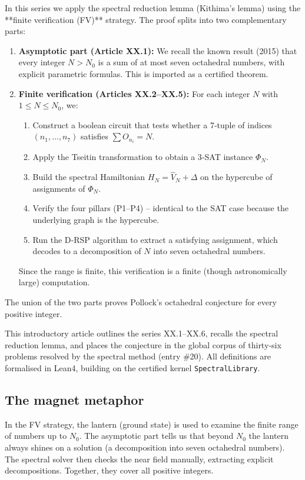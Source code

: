 \documentclass[11pt,a4paper]{article}
\begin{document}
In this series we apply the spectral reduction lemma (Kithima's lemma) using the **finite verification (FV)** strategy. The proof splits into two complementary parts:

\begin{enumerate}
\item \textbf{Asymptotic part (Article XX.1):} We recall the known result (2015) that every integer \(N > N_0\) is a sum of at most seven octahedral numbers, with explicit parametric formulas. This is imported as a certified theorem.
\item \textbf{Finite verification (Articles XX.2–XX.5):} For each integer \(N\) with \(1 \le N \le N_0\), we:
   \begin{enumerate}
   \item Construct a boolean circuit that tests whether a 7‑tuple of indices \((n_1,\dots,n_7)\) satisfies \(\sum O_{n_i} = N\).
   \item Apply the Tseitin transformation to obtain a 3‑SAT instance \(\Phi_N\).
   \item Build the spectral Hamiltonian \(H_N = \hat{V}_N + \Delta\) on the hypercube of assignments of \(\Phi_N\).
   \item Verify the four pillars (P1–P4) – identical to the SAT case because the underlying graph is the hypercube.
   \item Run the D‑RSP algorithm to extract a satisfying assignment, which decodes to a decomposition of \(N\) into seven octahedral numbers.
   \end{enumerate}
   Since the range is finite, this verification is a finite (though astronomically large) computation.
\end{enumerate}
The union of the two parts proves Pollock's octahedral conjecture for every positive integer.

This introductory article outlines the series XX.1–XX.6, recalls the spectral reduction lemma, and places the conjecture in the global corpus of thirty‑six problems resolved by the spectral method (entry \#20). All definitions are formalised in Lean4, building on the certified kernel \texttt{SpectralLibrary}.

\subsection{The magnet metaphor}

In the FV strategy, the lantern (ground state) is used to examine the finite range of numbers up to \(N_0\). The asymptotic part tells us that beyond \(N_0\) the lantern always shines on a solution (a decomposition into seven octahedral numbers). The spectral solver then checks the near field manually, extracting explicit decompositions. Together, they cover all positive integers.
\end{document}

